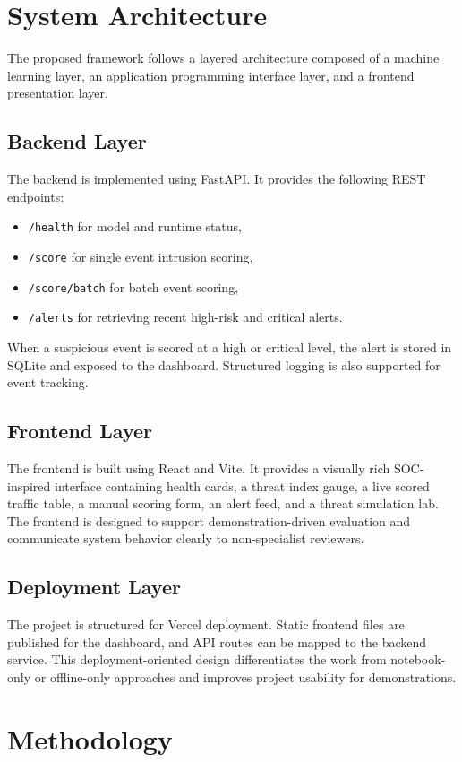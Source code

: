 \documentclass[conference]{IEEEtran}
\begin{document}
\section{System Architecture}
The proposed framework follows a layered architecture composed of a machine learning layer, an application programming interface layer, and a frontend presentation layer.

\subsection{Backend Layer}
The backend is implemented using FastAPI. It provides the following REST endpoints:
\begin{itemize}
\item \texttt{/health} for model and runtime status,
\item \texttt{/score} for single event intrusion scoring,
\item \texttt{/score/batch} for batch event scoring,
\item \texttt{/alerts} for retrieving recent high-risk and critical alerts.
\end{itemize}

When a suspicious event is scored at a high or critical level, the alert is stored in SQLite and exposed to the dashboard. Structured logging is also supported for event tracking.

\subsection{Frontend Layer}
The frontend is built using React and Vite. It provides a visually rich SOC-inspired interface containing health cards, a threat index gauge, a live scored traffic table, a manual scoring form, an alert feed, and a threat simulation lab. The frontend is designed to support demonstration-driven evaluation and communicate system behavior clearly to non-specialist reviewers.

\subsection{Deployment Layer}
The project is structured for Vercel deployment. Static frontend files are published for the dashboard, and API routes can be mapped to the backend service. This deployment-oriented design differentiates the work from notebook-only or offline-only approaches and improves project usability for demonstrations.

\section{Methodology}
\end{document}
